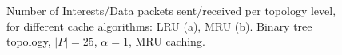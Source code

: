 \begin{figure}[h!]
    \centering



    \cprotect\caption{Number of Interests\slash Data packets sent\slash received 
        per topology level, for different cache algorithms: LRU (a), MRU (b). 
        Binary tree topology, $|P| = 25$, $\alpha = 1$, MRU caching.}
    \label{fig:exp-results-topologies-tree}

\end{figure}


